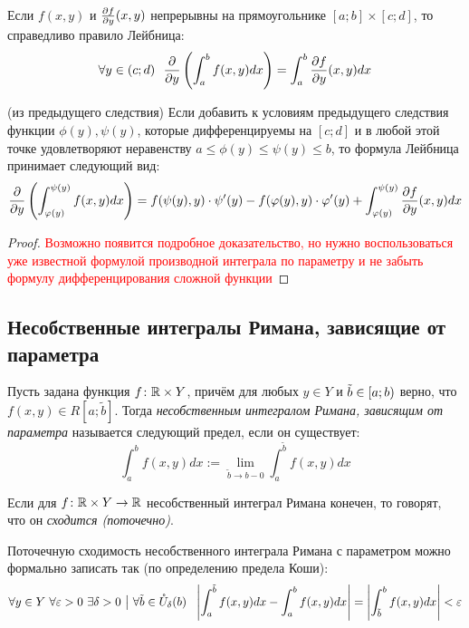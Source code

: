 \begin{corollary}
	Если $f(x, y)$ и $\frac{\partial f}{\partial y}(x, y)$ непрерывны  на прямоугольнике $[a; b] \times [c; d]$, то справедливо правило Лейбница:
	\[
		\forall y \in (c; d)\ \ \frac{\partial }{\partial y}\left(\int_a^b f(x, y)dx\right) = \int_a^b \frac{\partial f}{\partial y}(x, y)dx
	\]
\end{corollary}

\begin{corollary} (из предыдущего следствия)
	Если добавить к условиям предыдущего следствия функции $\phi(y), \psi(y)$, которые дифференцируемы на $[c; d]$ и в любой этой точке удовлетворяют неравенству $a \le \phi(y) \le \psi(y) \le b$, то формула Лейбница принимает следующий вид:
	\[
		\frac{\partial }{\partial y}\left(\int_{\varphi(y)}^{\psi(y)} f(x, y)dx\right) = f(\psi(y), y) \cdot \psi'(y) - f(\varphi(y), y) \cdot \varphi'(y) + \int_{\varphi(y)}^{\psi(y)} \frac{\partial f}{\partial y}(x, y)dx
	\]
\end{corollary}

\begin{proof}
	\textcolor{red}{Возможно появится подробное доказательство, но нужно воспользоваться уже известной формулой производной интеграла по параметру и не забыть формулу дифференцирования сложной функции}
\end{proof}

\subsection{Несобственные интегралы Римана, зависящие от параметра}

\begin{definition} 
	Пусть задана функция $f \colon \mathbb{R} \times Y$, причём для любых $y \in Y$ и $\tilde{b} \in \left[a; b\right)$ верно, что $f(x, y) \in R[a; \tilde{b}]$. Тогда \textit{несобственным интегралом Римана, зависящим от параметра} называется следующий предел, если он существует:
	\[
		\int_a^b f(x, y)dx := \lim_{\tilde{b} \to b-0} \int_a^{\tilde{b}} f(x, y)dx
	\]
\end{definition}

\begin{definition}
	Если для $f \colon \mathbb{R} \times Y \to \mathbb{R}$ несобственный интеграл Римана конечен, то говорят, что он \textit{сходится (поточечно)}.
\end{definition}

\begin{note}
	Поточечную сходимость несобственного интеграла Римана с параметром можно формально записать так (по определению предела Коши):
	\[
		\forall y \in Y\ \forall \eps > 0\ \exists \delta > 0 \such \forall \tilde{b} \in \mc{U}_\delta(b)\ \ \md{\int_a^{\tilde{b}} f(x, y)dx - \int_a^b f(x, y)dx} = \md{\int_{\tilde{b}}^b f(x, y)dx} < \eps
	\]
\end{note}

